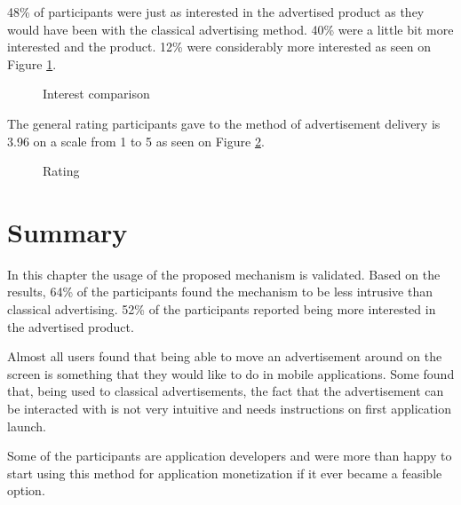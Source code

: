48\% of participants were just as interested in the advertised product as they would have been with the classical advertising method. 40\% were a little bit more interested and the product. 12\% were considerably more interested as seen on Figure \ref{q9}.

\begin{figure}
\begin{center}
\caption{Interest comparison}
\label{q9}
\end{center}
\end{figure}

The general rating participants gave to the method of advertisement delivery is 3.96 on a scale from 1 to 5 as seen on Figure \ref{q10}.

\begin{figure}
\begin{center}
\caption{Rating}
\label{q10}
\end{center}
\end{figure}

\section{Summary}

In this chapter the usage of the proposed mechanism is validated. Based on the results, 64\% of the participants found the mechanism to be less intrusive than classical advertising. 52\% of the participants reported being more interested in the advertised product.

Almost all users found that being able to move an advertisement around on the screen is something that they would like to do in mobile applications. Some found that, being used to classical advertisements, the fact that the advertisement can be interacted with is not very intuitive and needs instructions on first application launch.

Some of the participants are application developers and were more than happy to start using this method for application monetization if it ever became a feasible option.